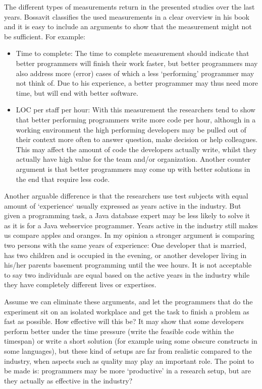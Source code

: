 The different types of measurements return in the presented studies over the last years.
Bossavit classifies the used measurements in a clear overview in his book \autocite[42-43]{bossavit2013leprechauns} and it is easy to include an arguments to show that the measurement might not be sufficient.
For example:
\begin{itemize}[noitemsep]
\item Time to complete:
The time to complete measurement should indicate that better programmers will finish their work faster,
but better programmers may also address more (error) cases of which a less `performing' programmer may not think of.
Due to his experience, a better programmer may thus need more time, but will end with better software.
\item LOC per staff per hour:
With this measurement the researchers tend to show that better performing programmers write more code per hour,
although in a working environment the high performing developers may be pulled out of their context more often to answer question, make decision or help colleagues.
This may affect the amount of code the developers actually write, whilst they actually have high value for the team and/or organization.
Another counter argument is that better programmers may come up with better solutions in the end that require less code.
\end{itemize}

Another arguable difference is that the researchers use test subjects with equal amount of `experience` usually expressed as years active in the industry.
But given a programming task, a Java database expert may be less likely to solve it as it is for a Java webservice programmer.
Years active in the industry still makes us compare apples and oranges.
In my opinion a stronger argument is comparing two persons with the same years of experience:
One developer that is married, has two children and is occupied in the evening,
or another developer living in his/her parents basement programming until the wee hours.
It is not acceptable to say two individuals are equal based on the active years in the industry while they have completely different lives or expertises.

Assume we can eliminate these arguments, and let the programmers that do the experiment sit on an isolated workplace and get the task to finish a problem as fast as possible.
How effective will this be?
It may show that some developers perform better under the time pressure (write the feasible code within the timespan) or write a short solution (for example using some obscure constructs in some languages),
but these kind of setups are far from realistic compared to the industry, when aspects such as quality may play an important role.
The point to be made is: programmers may be more `productive' in a research setup, but are they actually as effective in the industry?


